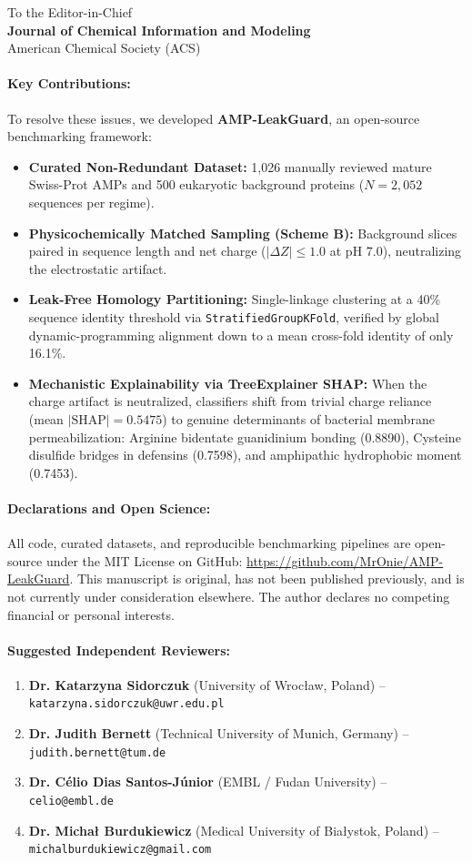 \documentclass[11pt,a4paper]{letter}
\begin{document}
\begin{letter}{
To the Editor-in-Chief\\
\textbf{Journal of Chemical Information and Modeling}\\
American Chemical Society (ACS)
}
\paragraph{Key Contributions:}
To resolve these issues, we developed \textbf{AMP-LeakGuard}, an open-source benchmarking framework:
\begin{itemize}
    \item \textbf{Curated Non-Redundant Dataset:} 1,026 manually reviewed mature Swiss-Prot AMPs and 500 eukaryotic background proteins ($N = 2,052$ sequences per regime).
    \item \textbf{Physicochemically Matched Sampling (Scheme B):} Background slices paired in sequence length and net charge ($|\Delta Z| \le 1.0$ at pH 7.0), neutralizing the electrostatic artifact.
    \item \textbf{Leak-Free Homology Partitioning:} Single-linkage clustering at a 40\% sequence identity threshold via \texttt{StratifiedGroupKFold}, verified by global dynamic-programming alignment down to a mean cross-fold identity of only 16.1\%.
    \item \textbf{Mechanistic Explainability via TreeExplainer SHAP:} When the charge artifact is neutralized, classifiers shift from trivial charge reliance (mean $|\text{SHAP}| = 0.5475$) to genuine determinants of bacterial membrane permeabilization: Arginine bidentate guanidinium bonding (0.8890), Cysteine disulfide bridges in defensins (0.7598), and amphipathic hydrophobic moment (0.7453).
\end{itemize}

\paragraph{Declarations and Open Science:}
All code, curated datasets, and reproducible benchmarking pipelines are open-source under the MIT License on GitHub: \url{https://github.com/MrOnie/AMP-LeakGuard}. This manuscript is original, has not been published previously, and is not currently under consideration elsewhere. The author declares no competing financial or personal interests.

\paragraph{Suggested Independent Reviewers:}
\begin{enumerate}
    \item \textbf{Dr. Katarzyna Sidorczuk} (University of Wrocław, Poland) -- \texttt{katarzyna.sidorczuk@uwr.edu.pl}
    \item \textbf{Dr. Judith Bernett} (Technical University of Munich, Germany) -- \texttt{judith.bernett@tum.de}
    \item \textbf{Dr. Célio Dias Santos-Júnior} (EMBL / Fudan University) -- \texttt{celio@embl.de}
    \item \textbf{Dr. Michał Burdukiewicz} (Medical University of Białystok, Poland) -- \texttt{michalburdukiewicz@gmail.com}
\end{enumerate}


\end{letter}
\end{document}
